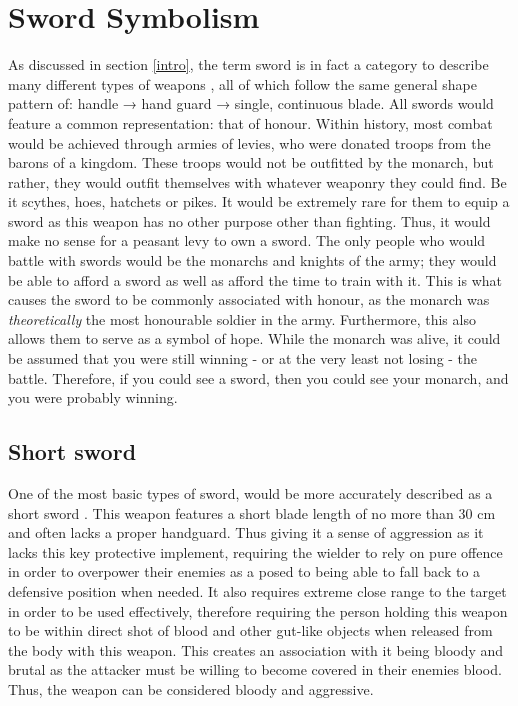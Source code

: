 \documentclass{article}
\begin{document}
\section{Sword Symbolism} \label{swordSymbol}
As discussed in section \ref{intro}, the term sword is in fact a category to describe many different types of weapons \parencite{furat1998brief}, all of which follow the same general shape pattern of: handle → hand guard → single, continuous blade.
All swords would feature a common representation: that of honour. Within history, most combat would be achieved through armies of levies, who were donated troops from the barons of a kingdom. These troops would not be outfitted by the monarch, but rather, they would outfit themselves with whatever weaponry they could find. Be it scythes, hoes, hatchets or pikes. It would be extremely rare for them to equip a sword as this weapon has no other purpose other than fighting. Thus, it would make no sense for a peasant levy to own a sword. The only people who would battle with swords would be the monarchs and knights of the army; they would be able to afford a sword as well as afford the time to train with it. This is what causes the sword to be commonly associated with honour, as the monarch was \textit{theoretically} the most honourable soldier in the army. Furthermore, this also allows them to serve as a symbol of hope. While the monarch was alive, it could be assumed that you were still winning - or at the very least not losing - the battle. Therefore, if you could see a sword, then you could see your monarch, and you were probably winning.

\subsection{Short sword} \label{shortSwordSymbol}
One of the most basic types of sword, would be more accurately described as a short sword \parencite{mcnab2010swords}. This weapon features a short blade length of no more than 30 cm and often lacks a proper handguard. Thus giving it a sense of aggression as it lacks this key protective implement, requiring the wielder to rely on pure offence in order to overpower their enemies as a posed to being able to fall back to a defensive position when needed. It also requires extreme close range to the target in order to be used effectively, therefore requiring the person holding this weapon to be within direct shot of blood and other gut-like objects when released from the body with this weapon. This creates an association with it being bloody and brutal as the attacker must be willing to become covered in their enemies blood. Thus, the weapon can be considered bloody and aggressive.
\end{document}
